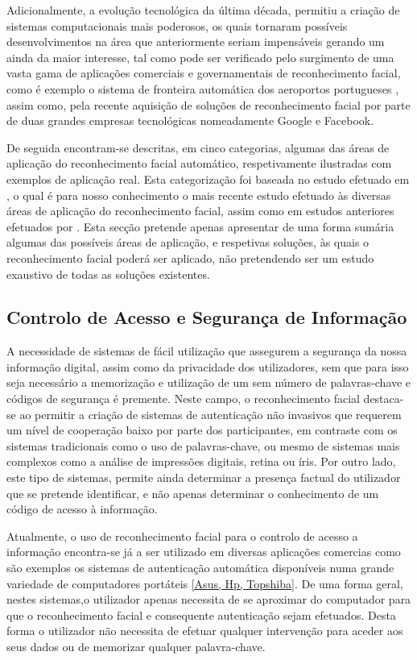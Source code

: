 Adicionalmente, a evolução tecnológica da última década, permitiu a criação de sistemas computacionais mais poderosos, os quais tornaram possíveis desenvolvimentos na área que anteriormente seriam impensáveis gerando um ainda da maior interesse, tal como pode ser verificado pelo surgimento de uma vasta gama de aplicações comerciais e governamentais de reconhecimento facial, como é exemplo o sistema de fronteira automática dos aeroportos portugueses \citep{MinisteriodaAdministracaoInternaa}, assim como, pela recente aquisição de soluções de reconhecimento facial por parte de duas grandes empresas tecnológicas nomeadamente Google e Facebook.

De seguida encontram-se descritas, em cinco categorias, algumas das áreas de aplicação do reconhecimento facial automático, respetivamente ilustradas com exemplos de aplicação real. Esta categorização foi baseada no estudo efetuado em \cite{Li2011}, o qual é para nosso conhecimento o mais recente estudo efetuado às diversas áreas de aplicação do reconhecimento facial, assim como em estudos anteriores efetuados por \cite{Zhao2003}. Esta secção pretende apenas apresentar de uma forma sumária algumas das possíveis áreas de aplicação, e respetivas soluções, às quais o reconhecimento facial poderá ser aplicado, não pretendendo ser um estudo exaustivo de todas as soluções existentes.

\subsection{Controlo de Acesso e Segurança de Informação} \label{sec:controloAcesso}
A necessidade de sistemas de fácil utilização que assegurem a segurança da nossa informação digital, assim como da privacidade dos utilizadores, sem que para isso seja necessário a memorização e utilização de um sem número de palavras-chave e códigos de segurança é premente. Neste campo, o reconhecimento facial destaca-se ao permitir a criação de sistemas de autenticação não invasivos que requerem um nível de cooperação baixo por parte dos participantes, em contraste com os sistemas tradicionais como o uso de palavras-chave, ou mesmo de sistemas mais complexos como a análise de impressões digitais, retina ou íris. Por outro lado, este tipo de sistemas, permite ainda determinar a presença factual do utilizador que se pretende identificar, e não apenas determinar o conhecimento de um código de acesso à informação.

Atualmente, o uso de reconhecimento facial para o controlo de acesso a informação encontra-se já a ser utilizado em diversas aplicações comercias como são exemplos os sistemas de autenticação automática disponíveis numa grande variedade de computadores portáteis \ref{Asus, Hp, Topshiba}. De uma forma geral, nestes sistemas,o utilizador apenas necessita de se aproximar do computador para que o reconhecimento facial e consequente autenticação sejam efetuados. Desta forma o utilizador não necessita de efetuar qualquer intervenção para aceder aos seus dados ou de memorizar qualquer palavra-chave.

